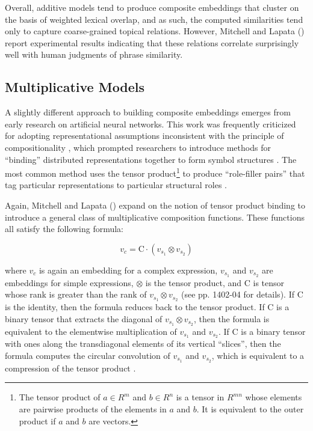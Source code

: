 Overall, additive models tend to produce composite embeddings that cluster on the basis of weighted lexical overlap, and as such, the computed similarities tend only to capture coarse-grained topical relations. However, Mitchell and Lapata (\citeyear{Mitchell:2010}) report experimental results indicating that these relations correlate surprisingly well with human judgments of phrase similarity.  

\subsection{Multiplicative Models}

A slightly different approach to building composite embeddings emerges from early research on artificial neural networks. This work was frequently criticized for adopting representational assumptions inconsistent with the principle of compositionality \citep[see e.g.][]{FodorPylyshyn:1988}, which prompted researchers to introduce methods for ``binding'' distributed representations together to form symbol structures \citep{Smolensky:1990,Plate:1995,Gayler:2004}. The most common method uses the tensor product\footnote{The tensor product of $ a \in R^m $ and $ b \in R^n $ is a tensor in $ R^{mn} $ whose elements are pairwise products of the elements in $a$ and $b$. It is equivalent to the outer product if $a$ and $b$ are vectors.} to produce ``role-filler pairs'' that tag particular representations to particular structural roles  \citep{SmolenskyLegendre:2006}.

Again, Mitchell and Lapata (\citeyear{Mitchell:2010}) expand on the notion of tensor product binding to introduce a general class of multiplicative composition functions. These functions all satisfy the following formula: 

\begin{equation}
v_{c} = \textrm{C} \cdot (v_{s_1} \otimes  v_{s_2})
\end{equation}

\noindent
where $ v_{c} $ is again an embedding for a complex expression, $ v_{s_1} $ and $ v_{s_2} $ are embeddings for simple expressions, $ \otimes $ is the tensor product, and $ \textrm{C} $ is tensor whose rank is greater than the rank of $ v_{s_1} \otimes  v_{s_2} $ (see pp. 1402-04 for details). If $ \textrm{C} $ is the identity, then the formula reduces back to the tensor product. If $ \textrm{C} $ is a binary tensor that extracts the diagonal of $ v_{s_1} \otimes  v_{s_2} $, then the formula is equivalent to the elementwise multiplication of $ v_{s_1} $ and $ v_{s_2} $. If $ \textrm{C} $ is a binary tensor with ones along the transdiagonal elements of its vertical ``slices'', then the formula computes the circular convolution of $ v_{s_1} $ and $ v_{s_2} $, which is equivalent to a compression of the tensor product \citep{Plate:2003,Mitchell:2010}. 


